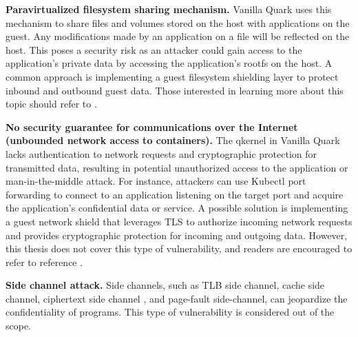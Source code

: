 \textbf{Paravirtualized filesystem sharing mechanism.} Vanilla Quark uses this mechanism to share files and volumes stored on the host with applications on the guest. Any modifications made by an application on a file will be reflected on the host. This poses a security risk as an attacker could 
gain access to the application’s private data by accessing the application's rootfs on the host. A common approach is implementing a guest filesystem shielding layer to protect inbound and outbound guest data. Those interested in learning more about this topic should 
refer to \cite*{file_system_shield}.


\textbf{No security guarantee for communications over the Internet (unbounded network access to containers).} The qkernel in Vanilla Quark lacks authentication to network requests and cryptographic protection for transmitted data, resulting in potential unauthorized access to the application or 
man-in-the-middle attack\cite*{Man_in_the_middle_attack}. For instance, attackers can use Kubectl port forwarding to connect to an application listening on the target port and acquire the application’s confidential data or service. A possible solution is implementing a guest network shield that leverages TLS to authorize 
incoming network requests and provides cryptographic protection for incoming and outgoing data. However, this thesis does not cover this type of vulnerability, and readers are encouraged to refer to reference \cite*{network_shiled}.

\textbf{Side channel attack.} Side channels, such as TLB side channel\cite*{217454}, cache side channel\cite*{7163050}, ciphertext side channel\cite*{274707} , and page-fault side-channel\cite*{236278}, can jeopardize the confidentiality of programs.  This type of vulnerability is considered out of the scope.



\cleardoublepage

